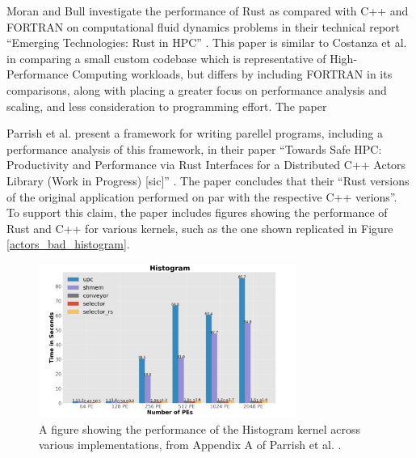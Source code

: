 Moran and Bull investigate the performance of Rust as compared with C++ and FORTRAN on computational fluid dynamics problems in their technical report ``Emerging Technologies: Rust in HPC'' \cite{moranEmergingTechnologiesRust2023}. This paper is similar to Costanza et al. in comparing a small custom codebase which is representative of High-Performance Computing workloads, but differs by including FORTRAN in its comparisons, along with placing a greater focus on performance analysis and scaling, and less consideration to programming effort. The paper 


Parrish et al. present a framework for writing parellel programs, including a performance analysis of this framework, in their paper ``Towards Safe HPC: Productivity and Performance via Rust Interfaces for a Distributed C++ Actors Library (Work in Progress) [sic]'' \cite{parrishSafeHPCProductivity2023}. The paper concludes that their ``Rust versions of the original application performed on par with the respective C++ verions''. To support this claim, the paper includes figures showing the performance of Rust and C++ for various kernels, such as the one shown replicated in Figure \ref{actors_bad_histogram}.

\begin{figure}[H]
    \centering
    \includegraphics[width=0.75\textwidth]{images/2_background/actors_bad_histogram.png}
    \caption{A figure showing the performance of the Histogram kernel across various implementations, from Appendix A of Parrish et al. \cite{parrishSafeHPCProductivity2023}.}
    \label{fig:actors_bad_histogram}
\end{figure}

